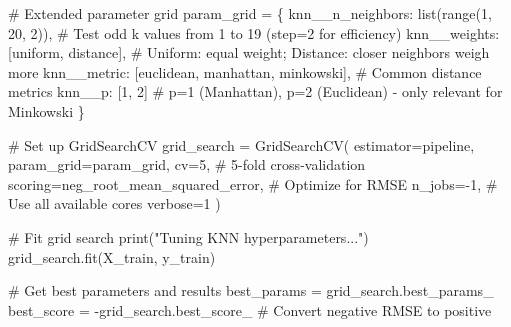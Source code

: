 \documentclass[
  letterpaper,
  DIV=11,
  numbers=noendperiod]{scrreprt}
\newenvironment{Shaded}{\begin{snugshade}}{\end{snugshade}}
\newcommand{\BuiltInTok}[1]{\textcolor[rgb]{0.00,0.23,0.31}{#1}}
\newcommand{\CommentTok}[1]{\textcolor[rgb]{0.37,0.37,0.37}{#1}}
\newcommand{\DecValTok}[1]{\textcolor[rgb]{0.68,0.00,0.00}{#1}}
\newcommand{\NormalTok}[1]{\textcolor[rgb]{0.00,0.23,0.31}{#1}}
\newcommand{\OperatorTok}[1]{\textcolor[rgb]{0.37,0.37,0.37}{#1}}
\newcommand{\StringTok}[1]{\textcolor[rgb]{0.13,0.47,0.30}{#1}}
\begin{document}
\begin{Shaded}
\begin{Highlighting}[]
\CommentTok{\# Extended parameter grid}
\NormalTok{param\_grid }\OperatorTok{=}\NormalTok{ \{}
    \StringTok{\textquotesingle{}knn\_\_n\_neighbors\textquotesingle{}}\NormalTok{: }\BuiltInTok{list}\NormalTok{(}\BuiltInTok{range}\NormalTok{(}\DecValTok{1}\NormalTok{, }\DecValTok{20}\NormalTok{, }\DecValTok{2}\NormalTok{)),  }\CommentTok{\# Test odd k values from 1 to 19 (step=2 for efficiency)}
    \StringTok{\textquotesingle{}knn\_\_weights\textquotesingle{}}\NormalTok{: [}\StringTok{\textquotesingle{}uniform\textquotesingle{}}\NormalTok{, }\StringTok{\textquotesingle{}distance\textquotesingle{}}\NormalTok{],  }\CommentTok{\# Uniform: equal weight; Distance: closer neighbors weigh more}
    \StringTok{\textquotesingle{}knn\_\_metric\textquotesingle{}}\NormalTok{: [}\StringTok{\textquotesingle{}euclidean\textquotesingle{}}\NormalTok{, }\StringTok{\textquotesingle{}manhattan\textquotesingle{}}\NormalTok{, }\StringTok{\textquotesingle{}minkowski\textquotesingle{}}\NormalTok{],  }\CommentTok{\# Common distance metrics}
    \StringTok{\textquotesingle{}knn\_\_p\textquotesingle{}}\NormalTok{: [}\DecValTok{1}\NormalTok{, }\DecValTok{2}\NormalTok{]  }\CommentTok{\# p=1 (Manhattan), p=2 (Euclidean) {-} only relevant for Minkowski}
\NormalTok{\}}

\CommentTok{\# Set up GridSearchCV}
\NormalTok{grid\_search }\OperatorTok{=}\NormalTok{ GridSearchCV(}
\NormalTok{    estimator}\OperatorTok{=}\NormalTok{pipeline,}
\NormalTok{    param\_grid}\OperatorTok{=}\NormalTok{param\_grid,}
\NormalTok{    cv}\OperatorTok{=}\DecValTok{5}\NormalTok{,  }\CommentTok{\# 5{-}fold cross{-}validation}
\NormalTok{    scoring}\OperatorTok{=}\StringTok{\textquotesingle{}neg\_root\_mean\_squared\_error\textquotesingle{}}\NormalTok{,  }\CommentTok{\# Optimize for RMSE}
\NormalTok{    n\_jobs}\OperatorTok{={-}}\DecValTok{1}\NormalTok{,  }\CommentTok{\# Use all available cores}
\NormalTok{    verbose}\OperatorTok{=}\DecValTok{1}
\NormalTok{)}

\CommentTok{\# Fit grid search}
\BuiltInTok{print}\NormalTok{(}\StringTok{"Tuning KNN hyperparameters..."}\NormalTok{)}
\NormalTok{grid\_search.fit(X\_train, y\_train)}

\CommentTok{\# Get best parameters and results}
\NormalTok{best\_params }\OperatorTok{=}\NormalTok{ grid\_search.best\_params\_}
\NormalTok{best\_score }\OperatorTok{=} \OperatorTok{{-}}\NormalTok{grid\_search.best\_score\_  }\CommentTok{\# Convert negative RMSE to positive}


\end{Highlighting}
\end{Shaded}
\end{document}
